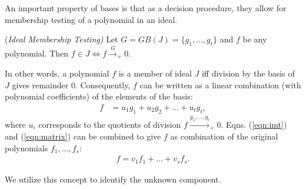 An important property of \Grobner bases is that as a decision
procedure, they allow for membership testing of a polynomial in an
ideal. 

\begin{Lemma}
\label{lem:imt}
({\it Ideal Membership Testing)
} 
Let $G = GB(J) = \{g_1,\dots,g_t\}$ and $f$ be any polynomial. Then
$f\in J \iff f\xrightarrow{G}_+0$.
\end{Lemma}

In other words, a polynomial $f$ is a member of ideal $J$ iff division
by the \Grobner basis of $J$ gives remainder 0. Consequently, $f$ can
be written as a linear combination (with polynomial coefficients) of
the elements of the \Grobner basis: 
\begin{align}\label{eqn:imt}
f & = u_1g_1 + u_2g_2+ \dots+ u_tg_t,
\end{align}
where $u_i$ corresponds to the quotients of division
$f\xrightarrow{g_1,\dots,g_t}_+0$. Eqns. (\ref{eqn:imt}) and
(\ref{eqn:matrix}) can be combined to give $f$ as combination of the
original polynomials $f_1,\dots,f_s$:
\begin{align}\label{eqn:imt_orig}
f = v_1f_1 +\dots+v_sf_s.
\end{align}

We utilize this concept to identify the unknown component. 


